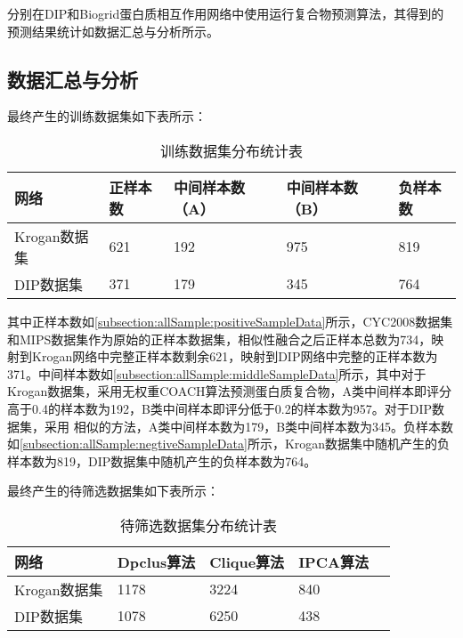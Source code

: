 分别在DIP和Biogrid蛋白质相互作用网络中使用运行复合物预测算法，其得到的预测结果统计如数据汇总与分析所示。




\subsection{数据汇总与分析}
\label{subsection:allSample:summary}

最终产生的训练数据集如下表所示：

\begin{table}[h]
    \centering
    \caption{训练数据集分布统计表}
    \label{tab:datasets:statistic:train}
    \begin{tabular}{C{3cm}C{2cm}C{3cm}C{3cm}C{2cm}}
        \toprule
        \textbf{网络} & \textbf{正样本数} & \textbf{中间样本数（A）} & \textbf{中间样本数（B）} & \textbf{负样本数} \\
        \midrule
        Krogan数据集  & 621               & 192                      & 975                      & 819               \\
        DIP数据集     & 371               & 179                      & 345                      & 764               \\
        \bottomrule
    \end{tabular}
\end{table}
其中正样本数如\ref{subsection:allSample:positiveSampleData}所示，CYC2008数据集和MIPS数据集作为原始的正样本数据集，相似性融合之后正样本总数为734，映射到Krogan网络中完整正样本数剩余621，映射到DIP网络中完整的正样本数为371。中间样本数如\ref{subsection:allSample:middleSampleData}所示，其中对于Krogan数据集，采用无权重COACH算法预测蛋白质复合物，A类中间样本即评分高于0.4的样本数为192，B类中间样本即评分低于0.2的样本数为957。对于DIP数据集，采用
相似的方法，A类中间样本数为179，B类中间样本数为345。负样本数如\ref{subsection:allSample:negtiveSampleData}所示，Krogan数据集中随机产生的负样本数为819，DIP数据集中随机产生的负样本数为764。

最终产生的待筛选数据集如下表所示：
\begin{table}[h]
    \centering
    \caption{待筛选数据集分布统计表}
    \label{tab:datasets:statistic:beselect}
    \begin{tabular}{C{3cm}C{2cm}C{3cm}C{3cm}C{2cm}}
        \toprule
        \textbf{网络} & \textbf{Dpclus算法} & \textbf{Clique算法} & \textbf{IPCA算法} \\
        \midrule
        Krogan数据集  & 1178                & 3224                & 840               \\
        DIP数据集     & 1078                & 6250                & 438               \\
        \bottomrule
    \end{tabular}
\end{table}

